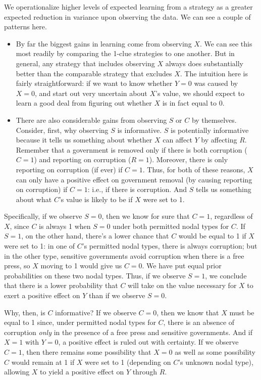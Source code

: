 \documentclass[
  12pt,
]{book}
\begin{document}
We operationalize higher levels of expected learning from a strategy as a greater expected reduction in variance upon observing the data. We can see a couple of patterns here.

\begin{itemize}
\item
  By far the biggest gains in learning come from observing \(X\). We can see this most readily by comparing the 1-clue strategies to one another. But in general, any strategy that includes observing \(X\) always does substantially better than the comparable strategy that excludes \(X\). The intuition here is fairly straightforward: if we want to know whether \(Y=0\) was caused by \(X=0\), and start out very uncertain about \(X\)'s value, we should expect to learn a good deal from figuring out whether \(X\) is in fact equal to \(0\).
\item
  There are also considerable gains from observing \(S\) or \(C\) by themselves. Consider, first, why observing \(S\) is informative. \(S\) is potentially informative because it tells us something about whether \(X\) can affect \(Y\) by affecting \(R\). Remember that a government is removed only if there is both corruption (\(C=1\)) and reporting on corruption (\(R=1\)). Moreover, there is only reporting on corruption (if ever) if \(C=1\). Thus, for both of these reasons, \(X\) can only have a positive effect on government removal (by causing reporting on corruption) if \(C=1\): i.e., if there is corruption. And \(S\) tells us something about what \(C\)'s value is likely to be if \(X\) were set to 1.
\end{itemize}

Specifically, if we observe \(S=0\), then we know for sure that \(C=1\), regardless of \(X\), since \(C\) is always 1 when \(S=0\) under both permitted nodal types for \(C\). If \(S=1\), on the other hand, there's a lower chance that \(C\) would be equal to 1 if \(X\) were set to 1: in one of \(C\)'s permitted nodal types, there is always corruption; but in the other type, sensitive governments avoid corruption when there is a free press, so \(X\) moving to 1 would give us \(C=0\). We have put equal prior probabilities on these two nodal types. Thus, if we observe \(S=1\), we conclude that there is a lower probability that \(C\) will take on the value necessary for \(X\) to exert a positive effect on \(Y\) than if we observe \(S=0\).

Why, then, is \(C\) informative? If we observe \(C=0\), then we know that \(X\) must be equal to 1 since, under permitted nodal types for \(C\), there is an absence of corruption \emph{only} in the presence of a free press and sensitive governments. And if \(X=1\) with \(Y=0\), a positive effect is ruled out with certainty. If we observe \(C=1\), then there remains some possibility that \(X=0\) as well as some possibility \(C\) would remain at 1 if \(X\) were set to 1 (depending on \(C\)'s unknown nodal type), allowing \(X\) to yield a positive effect on \(Y\) through \(R\).
\end{document}
